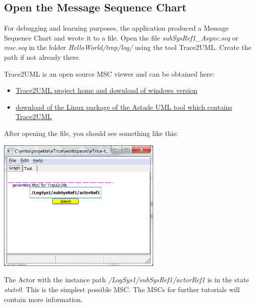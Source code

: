 \subsection{Open the Message Sequence Chart}

For debugging and learning purposes, the application produced a Message Sequence Chart and wrote it to a file. Open the file \emph{subSysRef1\_Async.seq} or \emph{msc.seq} in the folder \emph{HelloWorld/tmp/log/} using the tool Trace2UML. Create the path if not already there.

Trace2UML is an open source MSC viewer and can be obtained here:
\begin{itemize}
\item \href{http://trace2uml.tigris.org/}{Trace2UML project home and download of windows version} 
\item \href{http://apt.astade.de/}{download of the Linux package of the Astade UML tool which contains Trace2UML}
\end{itemize}
After opening the file, you should see something like this:

\includegraphics[width=0.6\textwidth]{images/015-HelloWorld09.png}

The Actor with the instance path \emph{/LogSys1/subSysRef1/actorRef1} is in the state \emph{state0}. 
This is the simplest possible MSC. The MSCs for further tutorials will contain more information.
